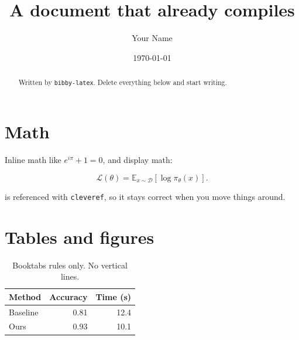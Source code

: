 \documentclass[11pt]{article}
\title{A document that already compiles}
\author{Your Name}
\date{\today}
\begin{document}
\maketitle

\begin{abstract}
Written by \texttt{bibby-latex}. Delete everything below and start writing.
\end{abstract}

\section{Math}
\label{sec:math}

Inline math like $e^{i\pi} + 1 = 0$, and display math:

\begin{equation}
  \label{eq:objective}
  \mathcal{L}(\theta) = \mathbb{E}_{x \sim \mathcal{D}}\!\left[ \log \pi_\theta(x) \right].
\end{equation}

 is referenced with \texttt{cleveref}, so it stays correct when you move things around.

\section{Tables and figures}

\begin{table}[ht]
  \centering
  \begin{tabular}{lrr}
    \toprule
    Method & Accuracy & Time (s) \\
    \midrule
    Baseline & 0.81 & 12.4 \\
    Ours     & 0.93 & 10.1 \\
    \bottomrule
  \end{tabular}
  \caption{Booktabs rules only. No vertical lines.}
  \label{tab:results}
\end{table}
\end{document}
